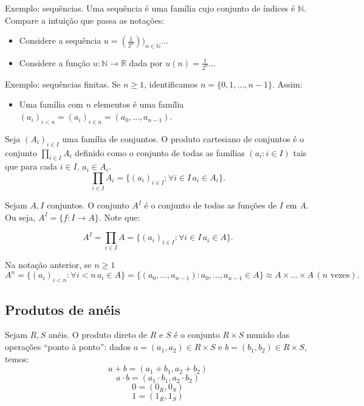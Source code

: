 Exemplo: sequências. Uma sequência é uma família cujo conjunto de índices é $\mathbb N$. Compare a intuição que passa as notações:
\begin{itemize}
\item Considere a sequência $u=(\frac{1}{2^n}))_{n \in \mathbb N}$...
\item Considere a função $u:\mathbb N\rightarrow \mathbb R$ dada por $u(n)=\frac{1}{2^n}$...
\end{itemize}

Exemplo: sequências finitas. Se $n\geq 1$, identificamos $n=\{0, 1, \dots, n-1\}$. Assim:
\begin{itemize}
\item Uma família com $n$ elementos é uma família $(a_i)_{i<n}=(a_i)_{i \in n}=(a_0, \dots, a_{n-1})$.
\end{itemize}

\begin{definition}
Seja $(A_i)_{i \in I}$ uma família de conjuntos. O produto cartesiano de conjuntos é o conjunto $\prod_{i \in I} A_i$ definido como o conjunto de todas as famílias $(a_i: i \in I)$ tais que para cada $i \in I$, $a_i \in A_i$.
$$\prod_{i \in I} A_i=\{(a_i)_{i \in I}: \forall i \in I\, a_i \in A_i\}.$$
\end{definition}


\begin{definition}
    Sejam $A, I$ conjuntos. O conjunto $A^I$ é o conjunto de todas as funções de $I$ em $A$. Ou seja, $A^I=\{f:I\rightarrow A\}$. Note que:

    $$A^I=\prod_{i \in I}A=\{(a_i)_{i \in I}: \forall i \in I\,  a_i\in A\}.$$
    \end{definition}

    Na notação anterior, se $n\geq 1$ $$A^n=\{(a_i)_{i<n}:\forall i<n\, a_i \in A\}=\{(a_0, \dots, a_{n-1}):a_0, \dots, a_{n-1}\in A\}\approx A\times \dots \times A \,(n \text{ vezes}).$$
    \subsection{Produtos de anéis}

    \begin{definition}
        Sejam $R, S$ anéis. O produto direto de $R$ e $S$ é o conjunto $R\times S$ munido das operações ``ponto à ponto'': dados $a=(a_1, a_2)\in R\times S$ e $b=(b_1, b_2)\in R\times S$, temos:
        $$a+b=(a_1+b_1, a_2+b_2)$$
        $$a\cdot b=(a_1\cdot b_1, a_2\cdot b_2)$$
        $$0=(0_R, 0_S)$$
        $$1=(1_R, 1_S)$$
    \end{definition}
    
